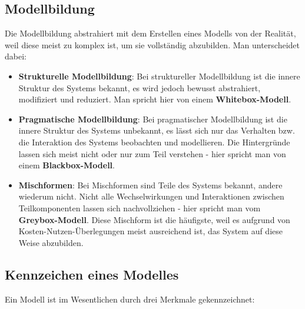 \documentclass[]{article}
\begin{document}
\subsection*{Modellbildung}\label{modellbildung}

Die Modellbildung abstrahiert mit dem Erstellen eines Modells von der
Realität, weil diese meist zu komplex ist, um sie vollständig
abzubilden. Man unterscheidet dabei:

\begin{itemize}
\item
  \textbf{Strukturelle Modellbildung}: Bei struktureller Modellbildung
  ist die innere Struktur des Systems bekannt, es wird jedoch bewusst
  abstrahiert, modifiziert und reduziert. Man spricht hier von einem
  \textbf{Whitebox-Modell}.
\item
  \textbf{Pragmatische Modellbildung}: Bei pragmatischer Modellbildung
  ist die innere Struktur des Systems unbekannt, es lässt sich nur das
  Verhalten bzw. die Interaktion des Systems beobachten und modellieren.
  Die Hintergründe lassen sich meist nicht oder nur zum Teil verstehen -
  hier spricht man von einem \textbf{Blackbox-Modell}.
\item
  \textbf{Mischformen}: Bei Mischformen sind Teile des Systems bekannt,
  andere wiederum nicht. Nicht alle Wechselwirkungen und Interaktionen
  zwischen Teilkomponenten lassen sich nachvollziehen - hier spricht man
  vom \textbf{Greybox-Modell}. Diese Mischform ist die häufigste, weil
  es aufgrund von Kosten-Nutzen-Überlegungen meist ausreichend ist, das
  System auf diese Weise abzubilden.
\end{itemize}

\subsection*{Kennzeichen eines
Modelles}\label{kennzeichen-eines-modelles}

Ein Modell ist im Wesentlichen durch drei Merkmale gekennzeichnet:
\end{document}
